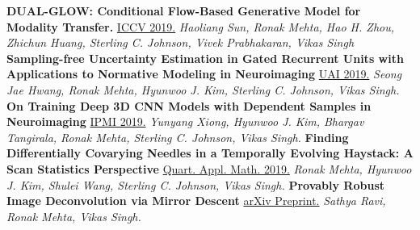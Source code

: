 \documentclass[]{article}
\begin{document}
{\bf  DUAL-GLOW: Conditional Flow-Based Generative Model for Modality Transfer.}
\newline
\href{http://openaccess.thecvf.com/content_ICCV_2019/html/Sun_DUAL-GLOW_Conditional_Flow-Based_Generative_Model_for_Modality_Transfer_ICCV_2019_paper.html}{ICCV 2019.}
\textit{Haoliang Sun, Ronak Mehta, Hao H. Zhou, Zhichun Huang, Sterling C. Johnson, Vivek Prabhakaran, Vikas Singh}
\newline\newline
{\bf Sampling-free Uncertainty Estimation in Gated Recurrent Units with Applications to Normative Modeling in Neuroimaging }
\newline
\href{http://auai.org/uai2019/proceedings/papers/296.pdf}{UAI 2019.}
\textit{Seong Jae Hwang, Ronak Mehta, Hyunwoo J. Kim, Sterling C. Johnson, Vikas Singh.}
\newline\newline
{\bf On Training Deep 3D CNN Models with Dependent Samples in Neuroimaging}
\newline
\href{https://link.springer.com/chapter/10.1007/978-3-030-20351-1_8}{IPMI 2019.}
\textit{Yunyang Xiong, Hyunwoo J. Kim, Bhargav Tangirala, Ronak Mehta, Sterling C. Johnson, Vikas Singh.}
\newline\newline
{\bf   Finding Differentially Covarying Needles in a Temporally Evolving Haystack: A Scan Statistics Perspective }
\newline
\href{https://www.ams.org/journals/qam/2019-77-02/S0033-569X-2018-01522-9/}{Quart. Appl. Math. 2019.}
\textit{Ronak Mehta, Hyunwoo J. Kim, Shulei Wang, Sterling C. Johnson, Vikas Singh.}
\newline\newline
{\bf Provably Robust Image Deconvolution via Mirror Descent}
\newline
\href{https://arxiv.org/abs/1803.08137}{arXiv Preprint.}
\textit{Sathya Ravi, Ronak Mehta, Vikas Singh.}
\fi
\end{document}
